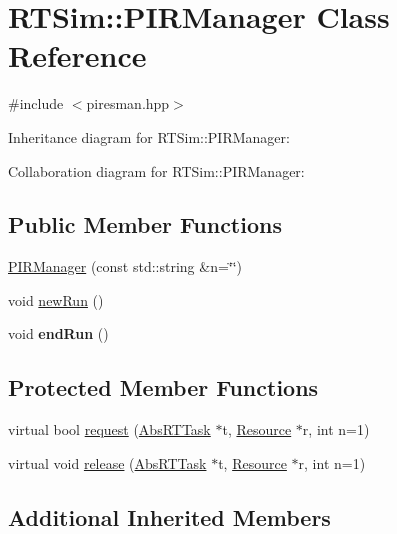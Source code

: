 \hypertarget{classRTSim_1_1PIRManager}{}\section{R\+T\+Sim\+:\+:P\+I\+R\+Manager Class Reference}
\label{classRTSim_1_1PIRManager}


{\ttfamily \#include $<$piresman.\+hpp$>$}



Inheritance diagram for R\+T\+Sim\+:\+:P\+I\+R\+Manager\+:


Collaboration diagram for R\+T\+Sim\+:\+:P\+I\+R\+Manager\+:
\subsection*{Public Member Functions}
\begin{DoxyCompactItemize}
\item 
\hyperlink{classRTSim_1_1PIRManager_a1d055b5f9ce3479bc3b94c544a79020f}{P\+I\+R\+Manager} (const std\+::string \&n=\char`\"{}\char`\"{})
\item 
void \hyperlink{classRTSim_1_1PIRManager_ae503c8b5ab06229f1c42d20bb06573f8}{new\+Run} ()
\item 
void {\bfseries end\+Run} ()\hypertarget{classRTSim_1_1PIRManager_ae73f2ebd1fa64d2af5620826b3d29276}{}\label{classRTSim_1_1PIRManager_ae73f2ebd1fa64d2af5620826b3d29276}

\end{DoxyCompactItemize}
\subsection*{Protected Member Functions}
\begin{DoxyCompactItemize}
\item 
virtual bool \hyperlink{classRTSim_1_1PIRManager_af396d4c2b654ad247779ed5716cace8c}{request} (\hyperlink{classRTSim_1_1AbsRTTask}{Abs\+R\+T\+Task} $\ast$t, \hyperlink{classRTSim_1_1Resource}{Resource} $\ast$r, int n=1)
\item 
virtual void \hyperlink{classRTSim_1_1PIRManager_ad9ad9ba5a6b1842d437e6a317abdbf46}{release} (\hyperlink{classRTSim_1_1AbsRTTask}{Abs\+R\+T\+Task} $\ast$t, \hyperlink{classRTSim_1_1Resource}{Resource} $\ast$r, int n=1)
\end{DoxyCompactItemize}
\subsection*{Additional Inherited Members}


